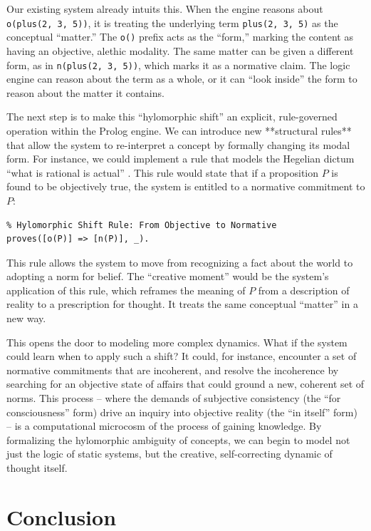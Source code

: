 \documentclass[12pt]{book}
\begin{document}
Our existing system already intuits this. When the engine reasons about \texttt{o(plus(2, 3, 5))}, it is treating the underlying term \texttt{plus(2, 3, 5)} as the conceptual ``matter.'' The \texttt{o()} prefix acts as the ``form,'' marking the content as having an objective, alethic modality. The same matter can be given a different form, as in \texttt{n(plus(2, 3, 5))}, which marks it as a normative claim. The logic engine can reason about the term as a whole, or it can ``look inside'' the form to reason about the matter it contains.

The next step is to make this ``hylomorphic shift'' an explicit, rule-governed operation within the Prolog engine. We can introduce new **structural rules** that allow the system to re-interpret a concept by formally changing its modal form. For instance, we could implement a rule that models the Hegelian dictum ``what is rational is actual'' \parencite{taylor2015hegel}. This rule would state that if a proposition $P$ is found to be objectively true, the system is entitled to a normative commitment to $P$:

\begin{verbatim}
% Hylomorphic Shift Rule: From Objective to Normative
proves([o(P)] => [n(P)], _).
\end{verbatim}

This rule allows the system to move from recognizing a fact about the world to adopting a norm for belief. The ``creative moment'' would be the system's application of this rule, which reframes the meaning of $P$ from a description of reality to a prescription for thought. It treats the same conceptual ``matter'' in a new way.

This opens the door to modeling more complex dynamics. What if the system could learn when to apply such a shift? It could, for instance, encounter a set of normative commitments that are incoherent, and resolve the incoherence by searching for an objective state of affairs that could ground a new, coherent set of norms. This process -- where the demands of subjective consistency (the ``for consciousness'' form) drive an inquiry into objective reality (the ``in itself'' form) -- is a computational microcosm of the process of gaining knowledge. By formalizing the hylomorphic ambiguity of concepts, we can begin to model not just the logic of static systems, but the creative, self-correcting dynamic of thought itself. 


\section{Conclusion}
\end{document}
